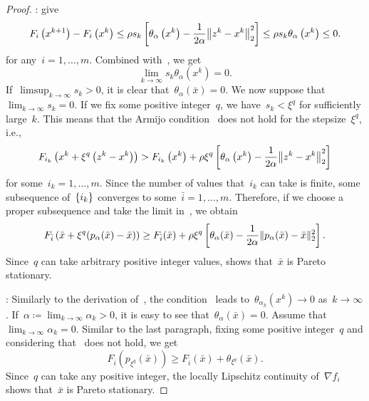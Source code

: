 \documentclass[../main]{subfiles}
\begin{document}
\begin{proof}
    :
     give
    \begin{equation}
        F_i\left(x^{k + 1}\right) - F_i\left(x^k\right) \le \rho s_k \left[ \theta_\alpha\left(x^k\right) - \frac{1}{2 \alpha} \norm*{z^k - x^k}_2^2\right] \le \rho s_k \theta_\alpha\left(x^k\right) \le 0
        .\end{equation}
    for any~$i = 1, \dots, m$.
    Combined with~, we get
    \begin{equation} \label{eq:pgm_stationary:step_merit_zero}
        \lim_{k \to \infty} s_k \theta_\alpha\left(x^k\right) = 0
        .\end{equation}
    If~$\limsup_{k \to \infty} s_k > 0$, it is clear that~$\theta_\alpha(\bar{x}) = 0$.
    We now suppose that~$\lim_{k \to \infty} s_k = 0$.
    If we fix some positive integer~$q$, we have~$s_k < \xi^q$ for sufficiently large~$k$.
    This means that the Armijo condition~ does not hold for the stepsize~$\xi^q$, i.e.,
    \begin{equation} \label{eq:pgm_stationary:non_armijo}
        F_{i_k}\left(x^k + \xi^q \left(z^k - x^k\right)\right) > F_{i_k}\left(x^k\right) + \rho \xi^q \left[ \theta_\alpha\left(x^k\right) - \frac{1}{2 \alpha} \norm*{z^k - x^k}_2^2 \right]
    \end{equation}
    for some~$i_k = 1, \dots, m$.
    Since the number of values that~$i_k$ can take is finite, some subsequence of~$\lbrace i_k\rbrace$ converges to some~$\bar{i} = 1, \dots, m$.
    Therefore, if we choose a proper subsequence and take the limit in~, we obtain
    \begin{equation}
        F_{\bar{i}}\left(\bar{x} + \xi^q (p_\alpha(\bar{x}) - \bar{x})\right) \ge F_{\bar{i}}(\bar{x}) + \rho \xi^q \left[ \theta_\alpha(\bar{x}) - \frac{1}{2 \alpha} \lVert p_\alpha(\bar{x}) - \bar{x}\rVert_2^2 \right]
        .\end{equation}
    Since~$q$ can take arbitrary positive integer values,  shows that~$\bar{x}$ is Pareto stationary.

    :
    Similarly to the derivation of~, the condition~ leads to~$\theta_{\alpha_k}\left(x^k\right) \to 0$ as~$k \to \infty$.
    If~$\alpha \coloneqq \lim_{k \to \infty} \alpha_k > 0$, it is easy to see that~$\theta_\alpha(\bar{x}) = 0$.
    Assume that~$\lim_{k \to \infty} \alpha_k = 0$.
    Similar to the last paragraph, fixing some positive integer~$q$ and considering that~ does not hold, we get
    \begin{equation}
        F_{\bar{i}}(p_{\xi^q}(\bar{x})) \ge F_{\bar{i}}(\bar{x}) + \theta_{\xi^q}(\bar{x})
        .\end{equation}
    Since~$q$ can take any positive integer, the locally Lipschitz continuity of~$\nabla f_i$ shows that~$\bar{x}$ is Pareto stationary.


\end{proof}
\end{document}

